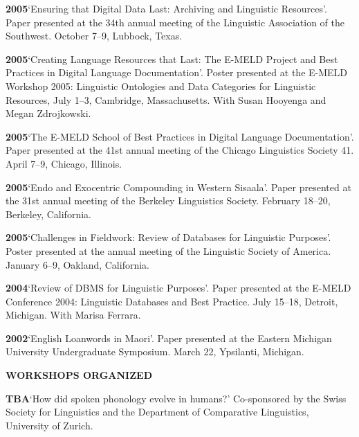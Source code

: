 \documentclass[11pt]{article}
\newcommand{\hangpara}{
 \setlength{\parindent}{0in} %
 \hangindent=0.42in %
}
\begin{document}
\vskip 6pt
\hangpara
{\bf 2005}\hspace{1ex}`Ensuring that Digital Data Last: Archiving and Linguistic Resources'. Paper presented at the 34th annual meeting of the Linguistic Association of the Southwest. October 7--9, Lubbock, Texas. 
 
\vskip 6pt
\hangpara
{\bf 2005}\hspace{1ex}`Creating Language Resources that Last: The E-MELD Project and Best Practices in Digital Language Documentation'. Poster presented at the E-MELD Workshop 2005: Linguistic Ontologies and Data Categories for Linguistic Resources, July 1--3, Cambridge, Massachusetts. With Susan Hooyenga and Megan Zdrojkowski.

\vskip 6pt
\hangpara
{\bf 2005}\hspace{1ex}`The E-MELD School of Best Practices in Digital Language Documentation'. Paper presented at the 41st annual meeting of the Chicago Linguistics Society 41. April 7--9, Chicago, Illinois.

\vskip 6pt
\hangpara
{\bf 2005}\hspace{1ex}`Endo and Exocentric Compounding in Western Sisaala'. Paper presented at the 31st annual meeting of the Berkeley Linguistics Society. February 18--20, Berkeley, California.

\vskip 6pt
\hangpara
{\bf 2005}\hspace{1ex}`Challenges in Fieldwork: Review of Databases for Linguistic Purposes'. Poster presented at the annual meeting of the Linguistic Society of America. January 6--9, Oakland, California.

\vskip 6pt
\hangpara
{\bf 2004}\hspace{1ex}`Review of DBMS for Linguistic Purposes'. Paper presented at the E-MELD Conference 2004: Linguistic Databases and Best Practice. July 15--18, Detroit, Michigan. With Marisa Ferrara.

\vskip 6pt
\hangpara
{\bf 2002}\hspace{1ex}`English Loanwords in Maori'. Paper presented at the Eastern Michigan University Undergraduate Symposium. March 22, Ypsilanti, Michigan.

\vskip 20pt
\begin{flushleft}
{\bf WORKSHOPS ORGANIZED}
\end{flushleft}

\hangpara
{\bf TBA}\hspace{1ex}`How did spoken phonology evolve in humans?' Co-sponsored by the Swiss Society for Linguistics and the Department of Comparative Linguistics, University of Zurich.
\end{document}
